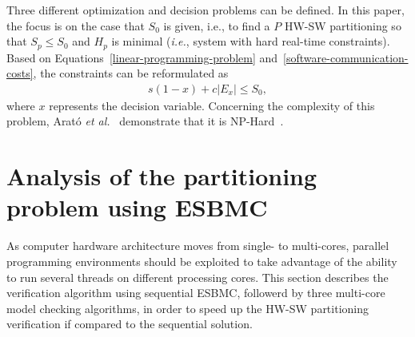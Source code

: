 Three different optimization and decision problems can be defined. In this paper, the focus is on the case that $ S_0 $ is given, i.e., to find a $P$ HW-SW partitioning so that $ S_p \leq S_0 $ and $ H_p $ is minimal ({\it i.e.}, system with hard real-time constraints). Based on Equations~\ref{linear-programming-problem} and~\ref{software-communication-costs}, the constraints can be reformulated as 
%
\begin{align}
\label{hw-sw-partitioning}
s\left(1-x\right) + c|E_x| \leq S_0, 
\end{align}
%
\noindent where $x$ represents the decision variable. Concerning the complexity of this problem, Arat\'o {\it et al.}~\cite{Arato2003} demonstrate that it is NP-Hard~\cite{Cormem}.


\section{Analysis of the partitioning problem using ESBMC}
\label{Analysis-of-the-partitioning-problem-using-ESBMC}

As computer hardware architecture moves from single- to multi-cores, parallel programming environments should be exploited to take advantage of the ability to run several threads on different processing cores. This section describes the verification algorithm using sequential ESBMC, followerd by three multi-core model checking algorithms, in order to speed up the HW-SW partitioning verification if compared to the sequential solution.

